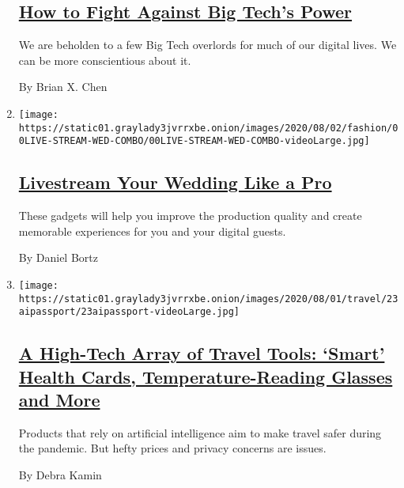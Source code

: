 \begin{enumerate}
  \hypertarget{how-to-fight-against-big-techs-power}{%
  \subsection{\texorpdfstring{\href{/2020/07/29/technology/personaltech/big-tech-power-how-to-fight.html}{How
  to Fight Against Big Tech's
  Power}}{How to Fight Against Big Tech's Power}}\label{how-to-fight-against-big-techs-power}}

  We are beholden to a few Big Tech overlords for much of our digital
  lives. We can be more conscientious about it.

  By Brian X. Chen
\item
  \texttt{[image: https://static01.graylady3jvrrxbe.onion/images/2020/08/02/fashion/00LIVE-STREAM-WED-COMBO/00LIVE-STREAM-WED-COMBO-videoLarge.jpg]}

  \hypertarget{livestream-your-wedding-like-a-pro}{%
  \subsection{\texorpdfstring{\href{/2020/07/28/fashion/weddings/livestream-your-wedding-like-a-pro.html}{Livestream
  Your Wedding Like a
  Pro}}{Livestream Your Wedding Like a Pro}}\label{livestream-your-wedding-like-a-pro}}

  These gadgets will help you improve the production quality and create
  memorable experiences for you and your digital guests.

  By Daniel Bortz
\item
  \texttt{[image: https://static01.graylady3jvrrxbe.onion/images/2020/08/01/travel/23aipassport/23aipassport-videoLarge.jpg]}

  \hypertarget{a-high-tech-array-of-travel-tools-smart-health-cards-temperature-reading-glasses-and-more}{%
  \subsection{\texorpdfstring{\href{/2020/07/23/travel/artificial-intelligence-coronavirus-passport.html}{A
  High-Tech Array of Travel Tools: `Smart' Health Cards,
  Temperature-Reading Glasses and
  More}}{A High-Tech Array of Travel Tools: `Smart' Health Cards, Temperature-Reading Glasses and More}}\label{a-high-tech-array-of-travel-tools-smart-health-cards-temperature-reading-glasses-and-more}}

  Products that rely on artificial intelligence aim to make travel safer
  during the pandemic. But hefty prices and privacy concerns are issues.

  By Debra Kamin
\end{enumerate}

